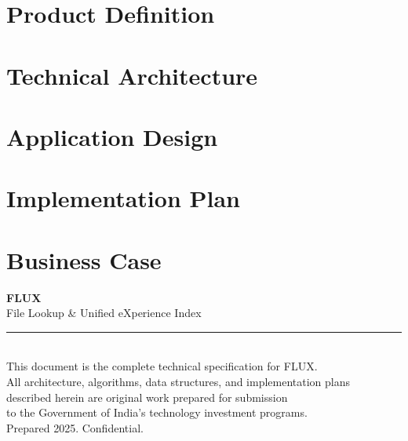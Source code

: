 \documentclass[11pt, a4paper, openright]{report}
\begin{document}
\newpage
\tableofcontents
\newpage

\part{Product Definition}


\part{Technical Architecture}


\part{Application Design}


\part{Implementation Plan}


\part{Business Case}


\newpage
\thispagestyle{plain}
\vspace*{60mm}

\begin{center}
{\Large\bfseries FLUX}\\[6pt]
{\large File Lookup \& Unified eXperience Index}\\[16pt]
\textcolor{rule}{\rule{80mm}{0.4pt}}\\[16pt]
{\small\textcolor{light}
This document is the complete technical specification for FLUX.\\[4pt]
All architecture, algorithms, data structures, and implementation plans\\
described herein are original work prepared for submission\\
to the Government of India's technology investment programs.\\[16pt]
Prepared 2025. Confidential.
}
\end{center}
\end{document}
